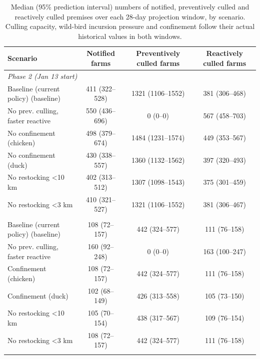 \begin{table}[t]
\centering
\caption{Median (95\% prediction interval) numbers of notified, preventively
culled and reactively culled premises over each 28-day projection window, by
scenario. Culling capacity, wild-bird incursion pressure and confinement follow their actual historical values in both windows.}
\label{tab:scenario_summary}
\begin{tabular}{lccc}
\toprule
Scenario & Notified farms & Preventively culled farms & Reactively culled farms \\
\midrule
\multicolumn{4}{l}{\textit{Phase 2 (Jan 13 start)}} \\
\quad Baseline (current policy) (baseline) & 411 (322--528) & 1321 (1106--1552) & 381 (306--468) \\
\quad No prev. culling, faster reactive & 550 (436--696) & 0 (0--0) & 567 (458--703) \\
\quad No confinement (chicken) & 498 (379--674) & 1484 (1231--1574) & 449 (353--567) \\
\quad No confinement (duck) & 430 (338--557) & 1360 (1132--1562) & 397 (320--493) \\
\quad No restocking <10 km & 402 (313--512) & 1307 (1098--1543) & 375 (301--459) \\
\quad No restocking <3 km & 410 (321--527) & 1321 (1106--1552) & 381 (306--467) \\
\addlinespace
\multicolumn{4}{l}{\textit{Phase 3 (Feb 14 start)}} \\
\quad Baseline (current policy) (baseline) & 108 (72--157) & 442 (324--577) & 111 (76--158) \\
\quad No prev. culling, faster reactive & 160 (92--248) & 0 (0--0) & 163 (100--247) \\
\quad Confinement (chicken) & 108 (72--157) & 442 (324--577) & 111 (76--158) \\
\quad Confinement (duck) & 102 (68--149) & 426 (313--558) & 105 (73--150) \\
\quad No restocking <10 km & 105 (70--154) & 438 (317--567) & 109 (76--154) \\
\quad No restocking <3 km & 108 (72--157) & 442 (324--577) & 111 (76--158) \\
\addlinespace
\bottomrule
\end{tabular}
\end{table}

